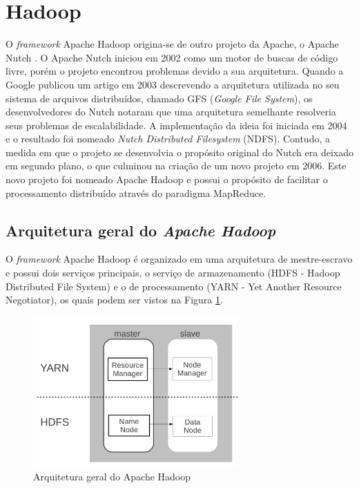 
\section{Hadoop}
O \textit{framework} Apache Hadoop origina-se de outro projeto da Apache, o Apache Nutch \cite{Nutch}. O Apache Nutch iniciou em 2002 como um motor de buscas de código livre, porém o projeto encontrou problemas devido a sua arquitetura. Quando a Google publicou um artigo em 2003 descrevendo a arquitetura utilizada no seu sistema de arquivos distribuídos, chamado GFS (\textit{Google File System}), os desenvolvedores do Nutch notaram que uma arquitetura semelhante resolveria seus problemas de escalabilidade. A implementação da ideia foi iniciada em 2004 e o resultado foi nomeado \textit{Nutch Distributed Filesystem} (NDFS). Contudo, a medida em que o projeto se desenvolvia o propósito original do Nutch era deixado em segundo plano, o que culminou na criação de um novo projeto em 2006. Este novo projeto foi nomeado Apache Hadoop e possui o propósito de facilitar o processamento distribuído através do paradigma MapReduce.

\subsection{Arquitetura geral do \emph{Apache Hadoop}}
O \textit{framework} Apache Hadoop é organizado em uma arquitetura de mestre-escravo e possui dois serviços principais, o serviço de armazenamento (HDFS - Hadoop Distributed File System) e o de processamento (YARN - Yet Another Resource Negotiator), os quais podem ser vistos na Figura \ref{fig:ArquiteturaHadoop}.

\begin{figure}[!ht]
\centering
\includegraphics[width=0.7\textwidth]{figuras/Figura08-HadoooArchGeral.png}
\caption{Arquitetura geral do Apache Hadoop}
\label{fig:ArquiteturaHadoop}
\end{figure}

